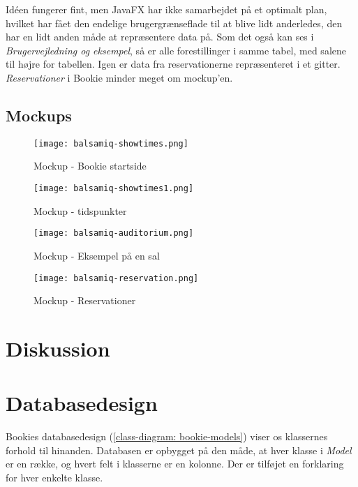 Idéen fungerer fint, men JavaFX har ikke samarbejdet på et optimalt plan, hvilket har fået den endelige brugergrænseflade til at blive lidt anderledes, den har en lidt anden måde at repræsentere data på. Som det også kan ses i \textit{Brugervejledning og eksempel}, så er alle forestillinger i samme tabel, med salene til højre for tabellen. Igen er data fra reservationerne repræsenteret i et gitter. \textit{Reservationer} i Bookie minder meget om mockup'en. 


\subsection{Mockups}

\begin{figure}[h]
  \centering
  \texttt{[image: balsamiq-showtimes.png]}
  \caption{Mockup - Bookie startside}
  \label{mockup: balsamiq-showtimes}
\end{figure}

\begin{figure}[h]
  \centering
  \texttt{[image: balsamiq-showtimes1.png]}
  \caption{Mockup - tidspunkter}
  \label{mockup: balsamiq-showtimes1}
\end{figure}

\begin{figure}[h]
  \centering
  \texttt{[image: balsamiq-auditorium.png]}
  \caption{Mockup - Eksempel på en sal}
  \label{mockup: balsamiq-auditorium}
\end{figure}

\begin{figure}[h]
  \centering
  \texttt{[image: balsamiq-reservation.png]}
  \caption{Mockup - Reservationer}
  \label{mockup: balsamiq-reservation}
\end{figure}

\section{Diskussion}

\section{Databasedesign}

Bookies databasedesign (\ref{class-diagram: bookie-models}) viser os klassernes forhold til hinanden. Databasen er opbygget på den måde, at hver klasse i \textit{Model} er en række, og hvert felt i klasserne er en kolonne. Der er tilføjet en forklaring for hver enkelte klasse.

